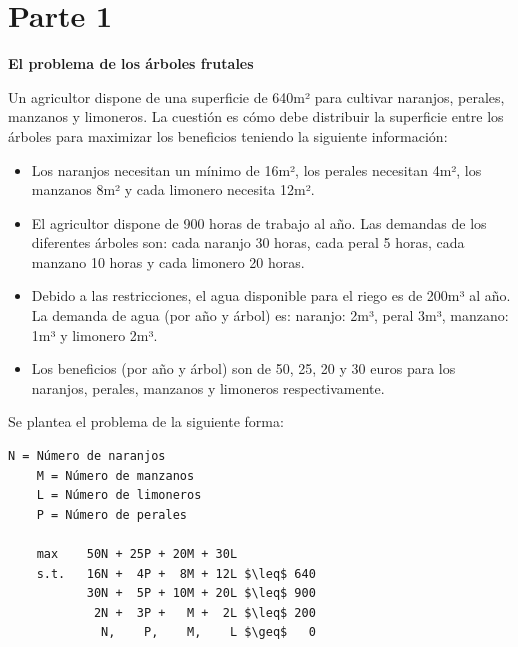 \documentclass[13pt,a4paper]{article}
\begin{document}
    
    
    \newpage


\section{Parte 1}

\textbf{El problema de los árboles frutales}

\vspace{\baselineskip}

Un agricultor dispone de una superficie de 640m² para cultivar naranjos, perales, manzanos y
limoneros. La cuestión es cómo debe distribuir la superficie entre los árboles para maximizar
los beneficios teniendo la siguiente información:

\begin{itemize}
    \item Los naranjos necesitan un mínimo de 16m², los perales necesitan 4m², los manzanos 8m² y cada limonero necesita 12m².
    \item El agricultor dispone de 900 horas de trabajo al año. Las demandas de los diferentes árboles son: cada naranjo 30 horas, cada peral 5 horas, cada manzano 10 horas y cada limonero 20 horas.
    \item Debido a las restricciones, el agua disponible para el riego es de 200m³ al año. La demanda de agua (por año y árbol) es: naranjo: 2m³, peral 3m³, manzano: 1m³ y limonero 2m³.
    \item Los beneficios (por año y árbol) son de 50, 25, 20 y 30 euros para los naranjos, perales, manzanos y limoneros respectivamente.
\end{itemize}

\vspace{\baselineskip}

Se plantea el problema de la siguiente forma:
\begin{lstlisting}[mathescape=true]
    N = Número de naranjos
    M = Número de manzanos
    L = Número de limoneros
    P = Número de perales

    max    50N + 25P + 20M + 30L 
    s.t.   16N +  4P +  8M + 12L $\leq$ 640
           30N +  5P + 10M + 20L $\leq$ 900
            2N +  3P +   M +  2L $\leq$ 200
             N,    P,    M,    L $\geq$   0
\end{lstlisting}
\end{document}
